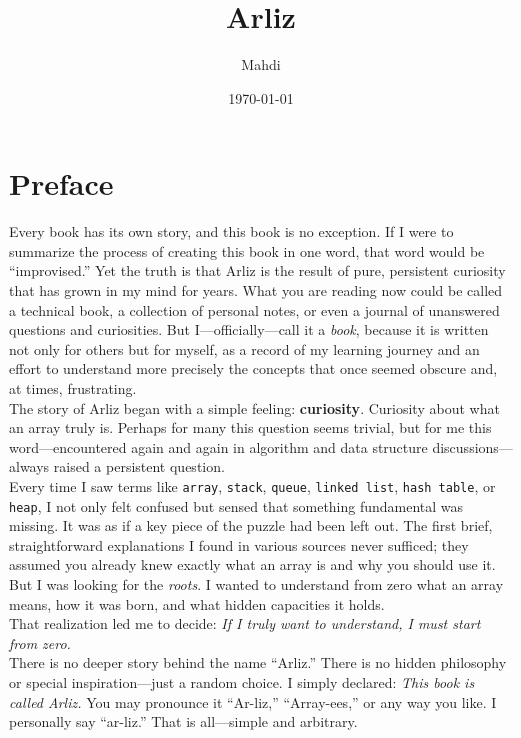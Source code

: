 \documentclass[12pt, oneside]{book}
\title{{\Huge Arliz}} %
\author{{\LARGE Mahdi}} %
\date{{\large \today}} %
\begin{document}
	\frontmatter
	\mainmatter
	\maketitle
	\tableofcontents
	\renewcommand{\arraystretch}{1.5} %
	
	\section{Preface}
	
	Every book has its own story, and this book is no exception. If I were to summarize the process of creating this book in one word, that word would be “improvised.” Yet the truth is that Arliz is the result of pure, persistent curiosity that has grown in my mind for years. What you are reading now could be called a technical book, a collection of personal notes, or even a journal of unanswered questions and curiosities. But I—officially—call it a \emph{book}, because it is written not only for others but for myself, as a record of my learning journey and an effort to understand more precisely the concepts that once seemed obscure and, at times, frustrating.\\
	The story of Arliz began with a simple feeling: \textbf{curiosity}.  
	Curiosity about what an array truly is. Perhaps for many this question seems trivial, but for me this word—encountered again and again in algorithm and data structure discussions—always raised a persistent question.\\
	Every time I saw terms like \texttt{array}, \texttt{stack}, \texttt{queue}, \texttt{linked list}, \texttt{hash table}, or \texttt{heap}, I not only felt confused but sensed that something fundamental was missing. It was as if a key piece of the puzzle had been left out. The first brief, straightforward explanations I found in various sources never sufficed; they assumed you already knew exactly what an array is and why you should use it. But I was looking for the \emph{roots}. I wanted to understand from zero what an array means, how it was born, and what hidden capacities it holds.\\
	That realization led me to decide:  
	\emph{If I truly want to understand, I must start from zero.}\\	
	There is no deeper story behind the name “Arliz.” There is no hidden philosophy or special inspiration—just a random choice. I simply declared:  
	\emph{This book is called Arliz.}  
	You may pronounce it “Ar-liz,” “Array-ees,” or any way you like. I personally say “ar-liz.” That is all—simple and arbitrary.\\	
\end{document}

